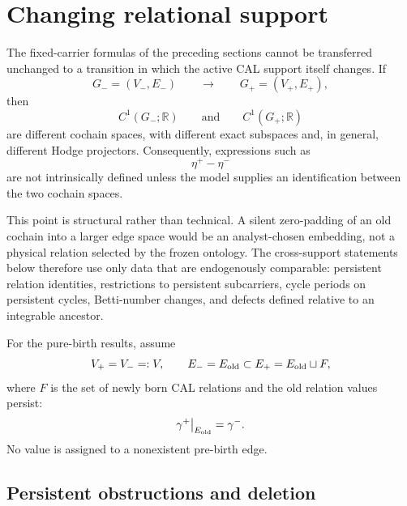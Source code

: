 
\section{Changing relational support}
\label{sec:support}

The fixed-carrier formulas of the preceding sections cannot be transferred unchanged to a transition in which the active CAL support itself changes. If
\begin{equation}
G_-=(V_-,E_-)
\qquad\longrightarrow\qquad
G_+=(V_+,E_+),
\end{equation}
then
\begin{equation}
C^1(G_-;\mathbb R)
\qquad\text{and}\qquad
C^1(G_+;\mathbb R)
\end{equation}
are different cochain spaces, with different exact subspaces and, in general, different Hodge projectors. Consequently, expressions such as
\begin{equation}
\eta^+-\eta^-
\end{equation}
are not intrinsically defined unless the model supplies an identification between the two cochain spaces.

This point is structural rather than technical. A silent zero-padding of an old cochain into a larger edge space would be an analyst-chosen embedding, not a physical relation selected by the frozen ontology. The cross-support statements below therefore use only data that are endogenously comparable: persistent relation identities, restrictions to persistent subcarriers, cycle periods on persistent cycles, Betti-number changes, and defects defined relative to an integrable ancestor.

For the pure-birth results, assume
\begin{equation}
V_+=V_-=:V,
\qquad
E_-=E_{\rm old}\subset E_+=E_{\rm old}\sqcup F,
\label{eq:pure-addition-support}
\end{equation}
where $F$ is the set of newly born CAL relations and the old relation values persist:
\begin{equation}
\gamma^+\big|_{E_{\rm old}}=\gamma^-.
\label{eq:persistent-old-values}
\end{equation}
No value is assigned to a nonexistent pre-birth edge.

\subsection{Persistent obstructions and deletion}

